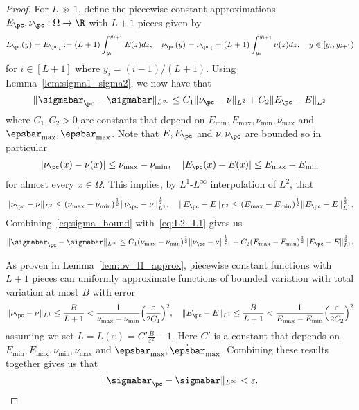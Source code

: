 \documentclass[letterpaper,11pt]{article}
\begin{document}
\begin{proof}
    For $L \gg 1$, define the piecewise constant approximations $E_{\pc}, \nu_{\pc}: \Omega \to \R$ with $L+1$ pieces given by
    \begin{equation}
        E_{\pc}(y) = {E_{\pc}}_i := (L+1)\int_{y_i}^{y_{i+1}}E(z)dz, \quad \nu_{\pc}(y) = {\nu_{\pc}}_i = (L+1)\int_{y_i}^{y_{i+1}}\nu(z)dz, \quad y \in [y_i, y_{i+1})
    \end{equation}
    for $i \in [L+1]$ where $y_i = (i-1)/(L+1)$. Using Lemma~\ref{lem:sigma1_sigma2}, we now have that
    \begin{equation}\label{eq:sigma_bound}
        \|\sigmabar_{\pc} - \sigmabar\|_{L^\infty} \leq C_1\|\nu_{\pc} - \nu\|_{L^2} + C_2\|E_{\pc} - E\|_{L^2}
    \end{equation}
    where $C_1, C_2 > 0$ are constants that depend on $E_{\min}, E_{\max}, \nu_{\min}, \nu_{\max}$ and $\epsbar_{\max}, \dot{\epsbar}_{\max}$. Note that $E, E_{\pc}$ and $\nu, \nu_{\pc}$ are bounded so in particular
    \begin{align*}
        |\nu_{\pc}(x) - \nu(x)| \leq \nu_{\max} - \nu_{\min}, \quad |E_{\pc}(x) - E(x)| \leq E_{\max} - E_{\min}
    \end{align*}
    for almost every $x \in \Omega$. This implies, by $L^1$-$L^\infty$ interpolation of $L^2$, that
    \begin{equation}\label{eq:L2_L1}
        \|\nu_{\pc} - \nu\|_{L^2} \leq (\nu_{\max} - \nu_{\min})^\frac{1}{2}\|\nu_{\pc} - \nu\|_{L^1}^\frac{1}{2}, \quad \|E_{\pc} - E\|_{L^2} \leq (E_{\max} - E_{\min})^\frac{1}{2}\|E_{\pc} - E\|_{L^1}^\frac{1}{2}.
    \end{equation}
    Combining~\eqref{eq:sigma_bound} with~\eqref{eq:L2_L1} gives us
    \begin{equation}
        \|\sigmabar_{\pc} - \sigmabar\|_{L^\infty} \leq C_1(\nu_{\max} - \nu_{\min})^\frac{1}{2}\|\nu_{\pc} - \nu\|_{L^1}^\frac{1}{2} + C_2(E_{\max} - E_{\min})^\frac{1}{2}\|E_{\pc} - E\|_{L^1}^\frac{1}{2}.
    \end{equation}
    
    As proven in Lemma~\ref{lem:bv_l1_approx}, piecewise constant functions with $L+1$ pieces can uniformly approximate functions of bounded variation with total variation at most $B$ with error
    \begin{equation}
        \|\nu_{\pc} - \nu\|_{L^1} \leq \frac{B}{L+1} < \frac{1}{\nu_{\max} - \nu_{\min}}\Big(\frac{\varepsilon}{2C_1}\Big)^2, \quad \|E_{\pc} - E\|_{L^1} \leq \frac{B}{L+1} < \frac{1}{E_{\max} - E_{\min}}\Big(\frac{\varepsilon}{2C_2}\Big)^2
    \end{equation}
    assuming we set $L = L(\varepsilon) = C'\frac{B}{\varepsilon^2} - 1$. Here $C'$ is a constant that depends on $E_{\min}, E_{\max}, \nu_{\min}, \nu_{\max}$ and $\epsbar_{\max}, \dot{\epsbar}_{\max}$. Combining these results together gives us that
    \begin{equation}
        \|\sigmabar_{\pc} - \sigmabar\|_{L^\infty} < \varepsilon.
    \end{equation}
    

\end{proof}
\end{document}
